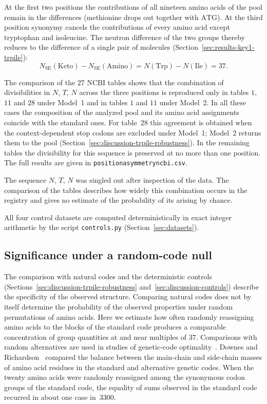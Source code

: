 \documentclass[11pt,a4paper]{article}
\renewcommand{\_}{\origunderscore\allowbreak}
\begin{document}
At the first two positions the contributions of all nineteen amino
acids of the pool remain in the differences (methionine drops out
together with $\mathrm{ATG}$). At the third position synonymy
cancels the contributions of every amino acid except tryptophan and
isoleucine. The neutron difference of the two groups thereby reduces
to the difference of a single pair of molecules
(Section~\ref{sec:results-key1-trpile}):
\[
N_{\mathrm{SE}}(\mathrm{Keto})
-N_{\mathrm{SE}}(\mathrm{Amino})
=N(\mathrm{Trp})-N(\mathrm{Ile})=37.
\]

The comparison of the $27$ NCBI tables shows that the combination of
divisibilities in $N$, $T$, $N$ across the three positions is
reproduced only in tables $1$, $11$ and $28$ under Model~1 and in
tables $1$ and $11$ under Model~2. In all these cases the
composition of the analyzed pool and its amino acid assignments
coincide with the standard ones. For table~$28$ this agreement is
obtained when the context-dependent stop codons are excluded under
Model~1; Model~2 returns them to the pool
(Section~\ref{sec:discussion-trpile-robustness}). In the remaining
tables the divisibility for this sequence is preserved at no more
than one position. The full results are given in
\texttt{position\_asymmetry\_ncbi.csv}.

The sequence $N$, $T$, $N$ was singled out after inspection of the
data. The comparison of the tables describes how widely this
combination occurs in the registry and gives no estimate of the
probability of its arising by chance.

All four control datasets are computed deterministically in exact
integer arithmetic by the script \texttt{controls.py}
(Section~\ref{sec:datasets}).

\subsection{Significance under a random-code null}
\label{sec:discussion-montecarlo}

The comparison with natural codes and the deterministic controls
(Sections~\ref{sec:discussion-trpile-robustness}
and~\ref{sec:discussion-controls}) describe the specificity of
the observed structure. Comparing natural codes does not by itself
determine the probability of the observed properties under random
permutations of amino acids. Here we estimate how often randomly
reassigning amino acids to the blocks of the standard code
produces a comparable concentration of group quantities at
and near multiples of $37$. Comparisons with random alternatives
are used in studies of genetic-code optimality~\citep{haig1991,freeland1998}. Downes and Richardson~\cite{downes2002} compared the balance between the main-chain and side-chain masses of amino acid residues in the standard and alternative genetic codes. When the twenty amino acids were randomly reassigned among the synonymous codon groups of the standard code, the equality of sums observed in the standard code recurred in about one case in~$3300$.
\end{document}
